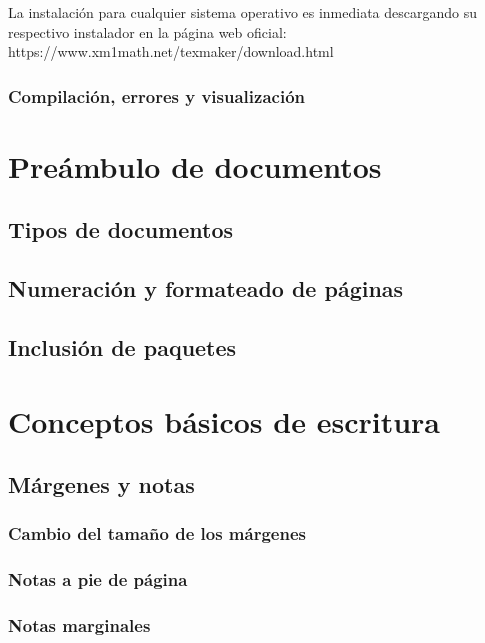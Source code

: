 \documentclass{article}
\begin{document}
La instalación para cualquier sistema operativo es inmediata descargando su respectivo instalador en la página web oficial: https://www.xm1math.net/texmaker/download.html

\subsubsection{Compilación, errores y visualización}

\section{Preámbulo de documentos}

\subsection{Tipos de documentos}

\subsection{Numeración y formateado de páginas}

\subsection{Inclusión de paquetes}

\section{Conceptos básicos de escritura}

\subsection{Márgenes y notas}

\subsubsection{Cambio del tamaño de los márgenes}

\subsubsection{Notas a pie de página}

\subsubsection{Notas marginales}
\end{document}

